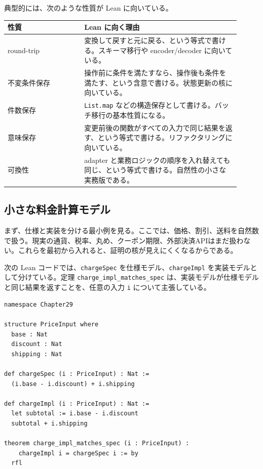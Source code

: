 典型的には、次のような性質が Lean に向いている。

\begin{longtable}{p{0.30\linewidth}p{0.61\linewidth}}
\toprule
\textbf{性質} & \textbf{Lean に向く理由} \\
\midrule
round-trip & 変換して戻すと元に戻る、という等式で書ける。スキーマ移行や encoder/decoder に向いている。 \\
不変条件保存 & 操作前に条件を満たすなら、操作後も条件を満たす、という含意で書ける。状態更新の核に向いている。 \\
件数保存 & \texttt{List.map} などの構造保存として書ける。バッチ移行の基本性質になる。 \\
意味保存 & 変更前後の関数がすべての入力で同じ結果を返す、という等式で書ける。リファクタリングに向いている。 \\
可換性 & adapter と業務ロジックの順序を入れ替えても同じ、という等式で書ける。自然性の小さな実務版である。 \\
\bottomrule
\end{longtable}

\subsection{小さな料金計算モデル}

まず、仕様と実装を分ける最小例を見る。ここでは、価格、割引、送料を自然数で扱う。現実の通貨、税率、丸め、クーポン期限、外部決済APIはまだ扱わない。これらを最初から入れると、証明の核が見えにくくなるからである。

\begin{leanbox}
次の Lean コードでは、\texttt{chargeSpec} を仕様モデル、\texttt{chargeImpl} を実装モデルとして分けている。定理 \texttt{charge\_impl\_matches\_spec} は、実装モデルが仕様モデルと同じ結果を返すことを、任意の入力 \texttt{i} について主張している。
\end{leanbox}

\begin{listing}[htbp]
\begin{verbatim}
namespace Chapter29

structure PriceInput where
  base : Nat
  discount : Nat
  shipping : Nat

def chargeSpec (i : PriceInput) : Nat :=
  (i.base - i.discount) + i.shipping

def chargeImpl (i : PriceInput) : Nat :=
  let subtotal := i.base - i.discount
  subtotal + i.shipping

theorem charge_impl_matches_spec (i : PriceInput) :
    chargeImpl i = chargeSpec i := by
  rfl
\end{verbatim}
\caption{仕様モデルと実装モデルを分ける}
\label{lst:ch29-charge-spec-impl}
\end{listing}

